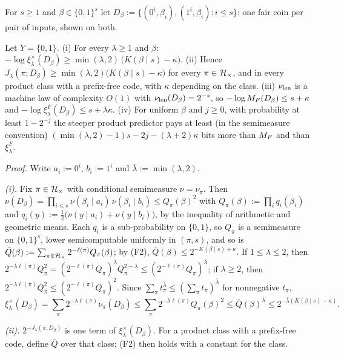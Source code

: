 For $s\ge1$ and $\beta\in\{0,1\}^s$ let $D_\beta:=\{(0^i,\beta_i),(1^i,\beta_i):i\le s\}$: one fair coin per pair of inputs, shown on both.

\begin{proposition}\label{prop:absorb:price}
Let $Y=\{0,1\}$.
(i) For every $\lambda\ge1$ and $\beta$: $-\log\xi^\times_\lambda(D_\beta)\ge\min(\lambda,2)\,\big(K(\beta\mid s)-\kappa\big)$. (ii) Hence $J_\lambda(\pi;D_\beta)\ge\min(\lambda,2)\big(K(\beta\mid s)-\kappa\big)$ for every $\pi\in\mathcal{H}_{\times}$, and in every product class with a prefix-free code, with $\kappa$ depending on the class. (iii) $\nu_{\mathrm{len}}$ is a machine law of complexity $O(1)$ with $\nu_{\mathrm{len}}(D_\beta)=2^{-s}$, so $-\log M_{F}(D_\beta)\le s+\kappa$ and $-\log\xi^F_\lambda(D_\beta)\le s+\lambda\kappa$. (iv) For uniform $\beta$ and $j\ge0$, with probability at least $1-2^{-j}$ the steeper product predictor pays at least (in the semimeasure convention) $(\min(\lambda,2)-1)s-2j-(\lambda+2)\kappa$ bits more than $M_{F}$ and than $\xi^F_\lambda$.
\end{proposition}

\emph{Proof.} Write $a_i:=0^i$, $b_i:=1^i$ and $\bar\lambda:=\min(\lambda,2)$.

\emph{(i).} Fix $\pi\in\mathcal{H}_{\times}$ with conditional semimeasure $\nu=\nu_\pi$. Then $\nu(D_\beta)=\prod_{i\le s}\nu(\beta_i\mid a_i)\,\nu(\beta_i\mid b_i)\le Q_\pi(\beta)^2$ with $Q_\pi(\beta):=\prod_iq_i(\beta_i)$ and $q_i(y):=\frac12\big(\nu(y\mid a_i)+\nu(y\mid b_i)\big)$, by the inequality of arithmetic and geometric means. Each $q_i$ is a sub-probability on $\{0,1\}$, so $Q_\pi$ is a semimeasure on $\{0,1\}^s$, lower semicomputable uniformly in $(\pi,s)$, and so is $\bar Q(\beta):=\sum_{\pi\in\mathcal{H}_{\times}}2^{-\ell(\pi)}Q_\pi(\beta)$; by (F2), $\bar Q(\beta)\le2^{-K(\beta\mid s)+\kappa}$. If $1\le\lambda\le2$, then $2^{-\lambda\ell(\pi)}Q_\pi^2=(2^{-\ell(\pi)}Q_\pi)^\lambda Q_\pi^{2-\lambda}\le(2^{-\ell(\pi)}Q_\pi)^\lambda$; if $\lambda\ge2$, then $2^{-\lambda\ell(\pi)}Q_\pi^2\le(2^{-\ell(\pi)}Q_\pi)^2$. Since $\sum_\pi t_\pi^{\bar\lambda}\le(\sum_\pi t_\pi)^{\bar\lambda}$ for nonnegative $t_\pi$,
\[
\xi^\times_\lambda(D_\beta)=\sum_\pi2^{-\lambda\ell(\pi)}\nu_\pi(D_\beta)\le\sum_\pi2^{-\lambda\ell(\pi)}Q_\pi(\beta)^2\le\bar Q(\beta)^{\bar\lambda}\le2^{-\bar\lambda(K(\beta\mid s)-\kappa)}.
\]

\emph{(ii).} $2^{-J_\lambda(\pi;D_\beta)}$ is one term of $\xi^\times_\lambda(D_\beta)$. For a product class with a prefix-free code, define $\bar Q$ over that class; (F2) then holds with a constant for the class.


